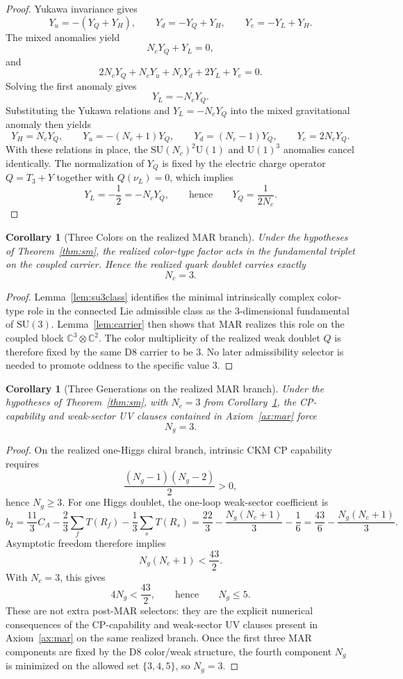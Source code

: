 \documentclass[11pt]{article}
\newtheorem{corollary}[theorem]{Corollary}
\newcommand{\SU}{\mathrm{SU}}
\newcommand{\U}{\mathrm{U}}
\begin{document}
\begin{proof}
Yukawa invariance gives
\[
Y_u=-(Y_Q+Y_H),\qquad
Y_d=-Y_Q+Y_H,\qquad
Y_e=-Y_L+Y_H.
\]
The mixed anomalies yield
\[
N_cY_Q+Y_L=0,
\]
and
\[
2N_cY_Q+N_cY_u+N_cY_d+2Y_L+Y_e=0.
\]
Solving the first anomaly gives
\[
Y_L=-N_cY_Q.
\]
Substituting the Yukawa relations and $Y_L=-N_cY_Q$ into the mixed gravitational anomaly then yields
\[
Y_H=N_cY_Q,\qquad
Y_u=-(N_c+1)Y_Q,\qquad
Y_d=(N_c-1)Y_Q,\qquad
Y_e=2N_cY_Q.
\]
With these relations in place, the $\SU(N_c)^2\U(1)$ and $\U(1)^3$ anomalies cancel identically. The normalization of $Y_Q$ is fixed by the electric charge operator $Q=T_3+Y$ together with $Q(\nu_L)=0$, which implies
\[
Y_L=-\frac12=-N_cY_Q,
\qquad\text{hence}\qquad
Y_Q=\frac{1}{2N_c}.
\]
\end{proof}

\begin{corollary}[Three Colors on the realized MAR branch]\label{cor:nc}
Under the hypotheses of Theorem~\ref{thm:sm}, the realized color-type factor acts in the fundamental triplet on the coupled carrier. Hence the realized quark doublet carries exactly
\[
N_c=3.
\]
\end{corollary}

\begin{proof}
Lemma~\ref{lem:su3class} identifies the minimal intrinsically complex color-type role in the connected Lie admissible class as the \(3\)-dimensional fundamental of \(\SU(3)\). Lemma~\ref{lem:carrier} then shows that MAR realizes this role on the coupled block \(\mathbb C^3\otimes\mathbb C^2\). The color multiplicity of the realized weak doublet \(Q\) is therefore fixed by the same D8 carrier to be \(3\). No later admissibility selector is needed to promote oddness to the specific value \(3\).
\end{proof}

\begin{corollary}[Three Generations on the realized MAR branch]\label{cor:ng}
Under the hypotheses of Theorem~\ref{thm:sm}, with \(N_c=3\) from Corollary~\ref{cor:nc}, the CP-capability and weak-sector UV clauses contained in Axiom~\ref{ax:mar} force
\[
N_g=3.
\]
\end{corollary}

\begin{proof}
On the realized one-Higgs chiral branch, intrinsic CKM CP capability requires
\[
\frac{(N_g-1)(N_g-2)}{2}>0,
\]
hence $N_g\ge 3$. For one Higgs doublet, the one-loop weak-sector coefficient is
\[
b_2=\frac{11}{3}C_A-\frac{2}{3}\sum_f T(R_f)-\frac{1}{3}\sum_s T(R_s)
=
\frac{22}{3}-\frac{N_g(N_c+1)}{3}-\frac16
=
\frac{43}{6}-\frac{N_g(N_c+1)}{3}.
\]
Asymptotic freedom therefore implies
\[
N_g(N_c+1)<\frac{43}{2}.
\]
With \(N_c=3\), this gives
\[
4N_g<\frac{43}{2},
\qquad\text{hence}\qquad
N_g\le 5.
\]
These are not extra post-MAR selectors: they are the explicit numerical consequences of the CP-capability and weak-sector UV clauses present in Axiom~\ref{ax:mar} on the same realized branch. Once the first three MAR components are fixed by the D8 color/weak structure, the fourth component \(N_g\) is minimized on the allowed set \(\{3,4,5\}\), so \(N_g=3\).
\end{proof}
\end{document}
